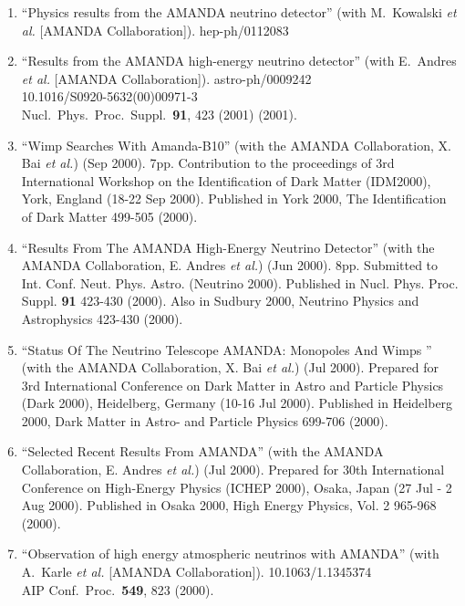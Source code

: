 \begin{enumerate}
\item ``Physics results from the AMANDA neutrino detector''
        (with M.~Kowalski {\it et al.}  [AMANDA
        Collaboration]). hep-ph/0112083 %

\item ``Results from the AMANDA high-energy neutrino
        detector'' (with E.~Andres {\it et al.}  [AMANDA
        Collaboration]). astro-ph/0009242
        \\{}10.1016/S0920-5632(00)00971-3 \\{}Nucl.\ Phys.\
        Proc.\ Suppl.\  {\bf 91}, 423 (2001) %
        (2001).

\item ``Wimp Searches With Amanda-B10'' (with the AMANDA
        Collaboration,   X. Bai {\it et al.}) (Sep 2000).
        7pp. Contribution to the proceedings of   3rd
        International Workshop on the Identification of Dark
        Matter   (IDM2000), York, England (18-22 Sep 2000).
        Published in York 2000,   The Identification of Dark
        Matter 499-505 (2000).

\item ``Results From The AMANDA High-Energy Neutrino
        Detector'' (with the   AMANDA Collaboration, E.
        Andres {\it et al.}) (Jun 2000). 8pp. Submitted   to
        Int. Conf. Neut. Phys. Astro. (Neutrino 2000).
        Published in   Nucl. Phys. Proc. Suppl. {\bf 91}
        423-430 (2000). Also in Sudbury   2000, Neutrino
        Physics and Astrophysics 423-430 (2000).

\item ``Status Of The Neutrino Telescope AMANDA: Monopoles
        And Wimps  '' (with the AMANDA Collaboration, X. Bai
        {\it et al.}) (Jul 2000).  Prepared   for 3rd
        International Conference on Dark Matter in Astro and
        Particle Physics (Dark 2000), Heidelberg, Germany
        (10-16 Jul 2000).   Published in Heidelberg 2000,
        Dark Matter in Astro- and Particle   Physics 699-706
        (2000).

\item ``Selected Recent Results From AMANDA'' (with the
        AMANDA   Collaboration, E. Andres {\it et al.}) (Jul
        2000).  Prepared for 30th   International Conference
        on High-Energy Physics (ICHEP 2000), Osaka,   Japan
        (27 Jul - 2 Aug 2000).  Published in Osaka 2000,
        High Energy   Physics, Vol. 2 965-968 (2000).

\item ``Observation of high energy atmospheric neutrinos
        with AMANDA'' (with A.~Karle {\it et al.}  [AMANDA
        Collaboration]). 10.1063/1.1345374 \\{}AIP Conf.\
        Proc.\ {\bf 549}, 823   (2000).


\end{enumerate}
